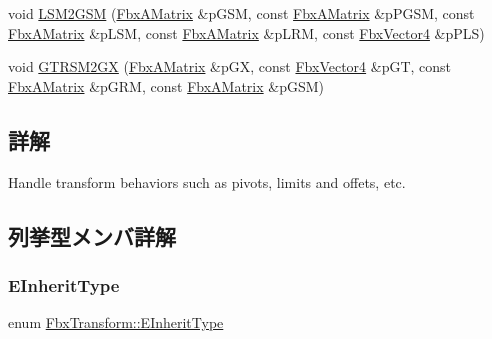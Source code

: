 \begin{DoxyCompactItemize}
\item 
void \hyperlink{class_fbx_transform_a152f85edfff375ffe59e27cbbd41c137}{L\+S\+M2\+G\+SM} (\hyperlink{class_fbx_a_matrix}{Fbx\+A\+Matrix} \&p\+G\+SM, const \hyperlink{class_fbx_a_matrix}{Fbx\+A\+Matrix} \&p\+P\+G\+SM, const \hyperlink{class_fbx_a_matrix}{Fbx\+A\+Matrix} \&p\+L\+SM, const \hyperlink{class_fbx_a_matrix}{Fbx\+A\+Matrix} \&p\+L\+RM, const \hyperlink{class_fbx_vector4}{Fbx\+Vector4} \&p\+P\+LS)
\item 
void \hyperlink{class_fbx_transform_a14282735e64e69f9cf4f6e14fa36b841}{G\+T\+R\+S\+M2\+GX} (\hyperlink{class_fbx_a_matrix}{Fbx\+A\+Matrix} \&p\+GX, const \hyperlink{class_fbx_vector4}{Fbx\+Vector4} \&p\+GT, const \hyperlink{class_fbx_a_matrix}{Fbx\+A\+Matrix} \&p\+G\+RM, const \hyperlink{class_fbx_a_matrix}{Fbx\+A\+Matrix} \&p\+G\+SM)
\end{DoxyCompactItemize}


\subsection{詳解}
Handle transform behaviors such as pivots, limits and offets, etc. 

\subsection{列挙型メンバ詳解}
\mbox{\label{class_fbx_transform_ac1ab8f75b4873723daa68c57f999b10f}} 
\subsubsection{\texorpdfstring{E\+Inherit\+Type}{EInheritType}}
{\footnotesize\ttfamily enum \hyperlink{class_fbx_transform_ac1ab8f75b4873723daa68c57f999b10f}{Fbx\+Transform\+::\+E\+Inherit\+Type}}

